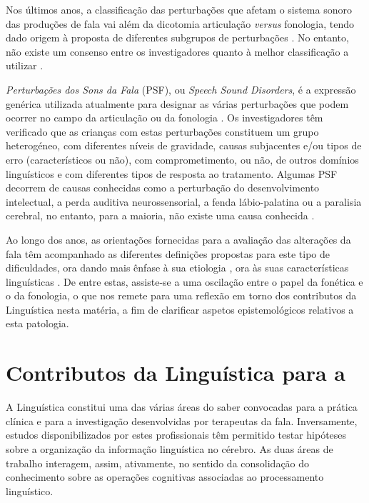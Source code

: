\documentclass[output=paper]{LSP/langsci}
\begin{document}
Nos últimos anos, a classificação das perturbações que afetam o sistema sonoro das produções de fala vai além da dicotomia articulação \textit{versus} fonologia, tendo dado origem à proposta de diferentes subgrupos de perturbações \citep{dodd2005understanding,shriberg_etal2010,stackhousewells1997}. No entanto, não existe um consenso entre os investigadores quanto à melhor classificação a utilizar \citep{waringknight2013}. 

\textit{Perturbações dos Sons da Fala} (PSF), ou \textit{Speech Sound Disorders}, é a expressão genérica utilizada atualmente para designar as várias perturbações que podem ocorrer no campo da articulação ou da fonologia \citep{apa2013}. Os investigadores têm verificado que as crianças com estas perturbações constituem um grupo heterogéneo, com diferentes níveis de gravidade, causas subjacentes e/ou tipos de erro (característicos ou não), com comprometimento, ou não, de outros domínios linguísticos e com diferentes tipos de resposta ao tratamento. Algumas PSF decorrem de causas conhecidas como a perturbação do desenvolvimento intelectual, a perda auditiva neurossensorial, a fenda lábio-palatina ou a paralisia cerebral, no entanto, para a maioria, não existe uma causa conhecida \citep{waringknight2013}.

Ao longo dos anos, as orientações fornecidas para a avaliação das alterações da fala têm acompanhado as diferentes definições propostas para este tipo de dificuldades, ora dando mais ênfase à sua etiologia \citep{shriberg_etal2010}, ora às suas características linguísticas \citep{broomfielddodd2004}. De entre estas, assiste-se a uma oscilação entre o papel da fonética e o da fonologia, o que nos remete para uma reflexão em torno dos contributos da Linguística nesta matéria, a fim de clarificar aspetos epistemológicos relativos a esta patologia.

\section{Contributos da Linguística para a }
\label{sec:lousada_contributos}

A Linguística constitui uma das várias áreas do saber convocadas para a prática clínica e para a investigação desenvolvidas por terapeutas da fala. Inversamente, estudos disponibilizados por estes profissionais têm permitido testar hipóteses sobre a organização da informação linguística no cérebro. As duas áreas de trabalho interagem, assim, ativamente, no sentido da consolidação do conhecimento sobre as operações cognitivas associadas ao processamento linguístico.
\end{document}

